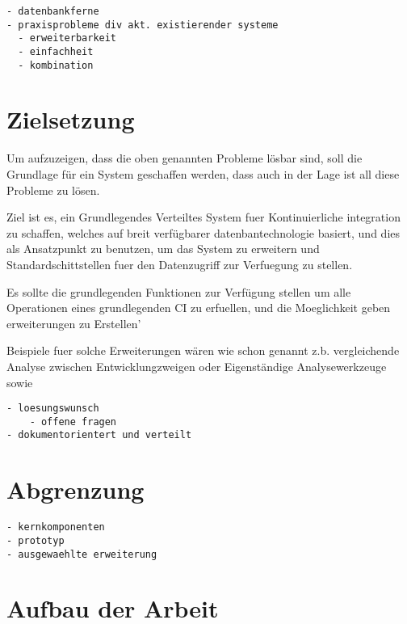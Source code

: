 \begin{verbatim}
- datenbankferne
- praxisprobleme div akt. existierender systeme
  - erweiterbarkeit
  - einfachheit
  - kombination

\end{verbatim}

\section{Zielsetzung}

Um aufzuzeigen, dass die oben genannten Probleme lösbar sind,
soll die Grundlage für ein System geschaffen werden,
dass auch in der Lage ist all diese Probleme zu lösen.

Ziel ist es, ein Grundlegendes Verteiltes System fuer Kontinuierliche integration zu schaffen,
welches auf breit verfügbarer datenbantechnologie basiert,
und dies als Ansatzpunkt zu benutzen,
um das System zu erweitern und Standardschittstellen fuer den Datenzugriff zur Verfuegung zu stellen.

Es sollte die grundlegenden Funktionen zur Verfügung stellen um alle Operationen
eines grundlegenden CI zu erfuellen,
und die Moeglichkeit geben erweiterungen zu Erstellen'

Beispiele fuer solche Erweiterungen wären wie schon genannt
z.b. vergleichende Analyse zwischen Entwicklungzweigen oder Eigenständige Analysewerkzeuge
sowie

\begin{verbatim}
- loesungswunsch
    - offene fragen
- dokumentorientert und verteilt
\end{verbatim}

\section{Abgrenzung}

\begin{verbatim}
- kernkomponenten
- prototyp
- ausgewaehlte erweiterung

\end{verbatim}

\section{Aufbau der Arbeit}


